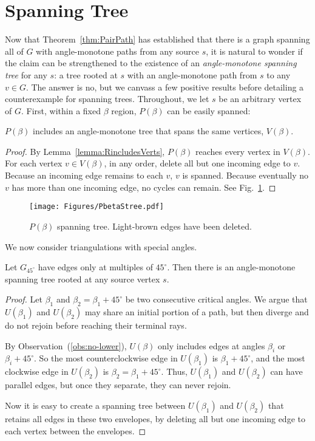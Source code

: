 \documentclass{cccg17}
\newcommand{\bluenew}[1]{{#1}}  %
\newcommand{\cyannew}[1]{{#1}}  %
\newcommand{\rednote}[1]{{}}  %
\newcommand{\lemlab}[1]{\label{lemma:#1}}
\newcommand{\figlab}[1]{\label{fig:#1}}
\newcommand{\seclab}[1]{\label{sec:#1}}
\newcommand{\lemref}[1]{\ref{lemma:#1}}
\newcommand{\thmref}[1]{\ref{thm:#1}}
\newcommand{\figref}[1]{\ref{fig:#1}}
\def\b{{\beta}}
\begin{document}
\section{Spanning Tree}
\seclab{SpanningTree}
Now that Theorem~\thmref{PairPath} has established that there is
a graph spanning all of $G$ with angle-monotone paths from any source $s$,
it is natural to wonder if the claim can be strengthened to the existence of
\cyannew{an \emph{angle-monotone spanning tree}} for any $s$: 
\bluenew{a tree rooted at $s$ with an angle-monotone path
from $s$ to any $v \in G$.}
The answer is {\sc no}, but we canvass a few positive results
before detailing a counterexample for spanning trees.
\bluenew{Throughout, we let $s$ be an arbitrary vertex of $G$.}
\rednote{JOR: Because reviewer seems to need this explicit.}
First, within a fixed $\b$ region, $P(\b)$ can be easily spanned:
\begin{lemma}
$P(\b)$ includes \bluenew{an angle-monotone tree} that spans the same vertices, $V(\b)$.
\lemlab{PbetaStree}
\end{lemma}
\begin{proof}
\bluenew{By Lemma~\lemref{RincludesVerts}, $P(\b)$ reaches every vertex in $V(\b)$.}
For each vertex $v \in V(\b)$, in any order, delete all but one incoming edge to $v$.
Because an incoming edge remains to each $v$, $v$ is spanned.
Because eventually no $v$ has more than one incoming edge, no cycles can remain.
See Fig.~\figref{PbetaStree}. %
\end{proof}
\begin{figure}[htbp]
\centering
\texttt{[image: Figures/PbetaStree.pdf]}
\caption{$P(\b)$ spanning tree. Light-brown edges have been deleted.}
\figlab{PbetaStree}
\end{figure}

We now consider triangulations with special angles.

\begin{lemma}
Let $G_{45^\circ}$ have edges only at multiples of $45^\circ$.
Then there is an angle-monotone
spanning tree rooted at any source vertex $s$.
\lemlab{k45}
\end{lemma}
\begin{proof}
Let $\b_1$ and $\b_2 = \b_1 + 45^\circ$ be two consecutive critical angles.
We argue that $U(\b_1)$ and $U(\b_2)$ may share an initial portion of a path,
but then diverge and do not rejoin before reaching 
their terminal rays.

By Observation~(\ref{obs:no-lower}), $U(\b)$
only includes edges at angles $\b_i$ or $\b_i+45^\circ$.
So the most counterclockwise edge in 
$U(\b_1)$
is $\b_1+45^\circ$,
and the most clockwise edge in 
$U(\b_2)$
is $\b_2 = \b_1 + 45^\circ$.
Thus, $U(\b_1)$ and $U(\b_2)$
can \bluenew{have parallel edges}, but once
they separate, they can never rejoin.

Now it is easy to create a spanning tree between 
$U(\b_1)$ and $U(\b_2)$
that retains all edges in these two envelopes, by deleting all but one
incoming edge to each vertex between the envelopes.
\end{proof}
\end{document}
